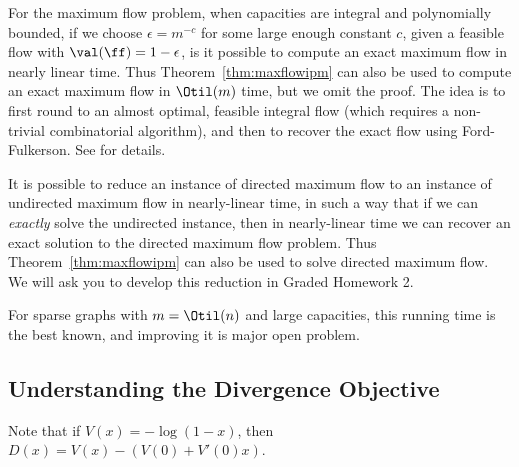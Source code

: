 \begin{remark}
  For the maximum flow problem, when capacities are integral and
  polynomially bounded, if we choose $\epsilon = m^{-c}$ for some
  large enough constant $c$, given a feasible flow with $\val(\ff) =
  1-\epsilon$, is it possible to compute an exact maximum flow in
  nearly linear time.
  Thus Theorem~\ref{thm:maxflowipm} can also be used to compute an
  exact maximum flow in $\Otil(m)$ time, but we omit the proof.
  The idea is to first round to an almost optimal, feasible integral flow (which
  requires a non-trivial combinatorial algorithm), and then to recover
  the exact flow using Ford-Fulkerson.
  See \cite{M13} for details.
\end{remark}

\begin{remark}
  It is possible to reduce an instance of directed maximum flow to an
  instance of undirected maximum flow in nearly-linear time, in such a
  way that if we can \emph{exactly} solve the undirected instance,
  then in nearly-linear time we can recover an exact solution to the
  directed maximum flow problem.
  Thus Theorem~\eqref{thm:maxflowipm} can also be used to solve
  directed maximum flow.
  We will ask you to develop this reduction in Graded Homework 2.
\end{remark}

\begin{remark}
  For sparse graphs with $m = \Otil(n)$ and large capacities, this
  running time is the best known, and improving it is major open problem.
\end{remark}

\subsection{Understanding the Divergence Objective}
Note that if $V(x) = -\log(1-x)$, then $D(x) = V(x) - (V(0) + V'(0) x)$.



